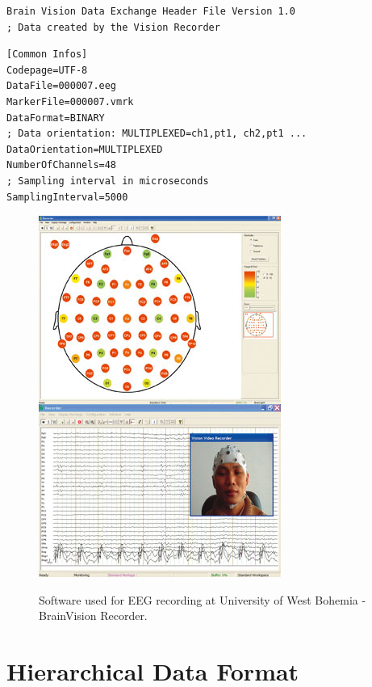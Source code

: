 \begin{lstlisting}[frame=single,caption={The header file example - Information about the file format.},label=HeaderFile1]
Brain Vision Data Exchange Header File Version 1.0
; Data created by the Vision Recorder
\end{lstlisting}
\begin{lstlisting}[frame=single,caption={The header file example - Information about coding, created files, data orientation, number of recorded channels and sampling interval.},label=HeaderFile2]
[Common Infos]
Codepage=UTF-8
DataFile=000007.eeg
MarkerFile=000007.vmrk
DataFormat=BINARY
; Data orientation: MULTIPLEXED=ch1,pt1, ch2,pt1 ...
DataOrientation=MULTIPLEXED
NumberOfChannels=48
; Sampling interval in microseconds
SamplingInterval=5000
\end{lstlisting}







\begin{figure}
	\caption{Software used for EEG recording at University of West Bohemia - BrainVision Recorder. \cite{brainvision}}
	\includegraphics{obrazky/recorder.png}	
	\label{recorder}
\end{figure}

\section{Hierarchical Data Format}

